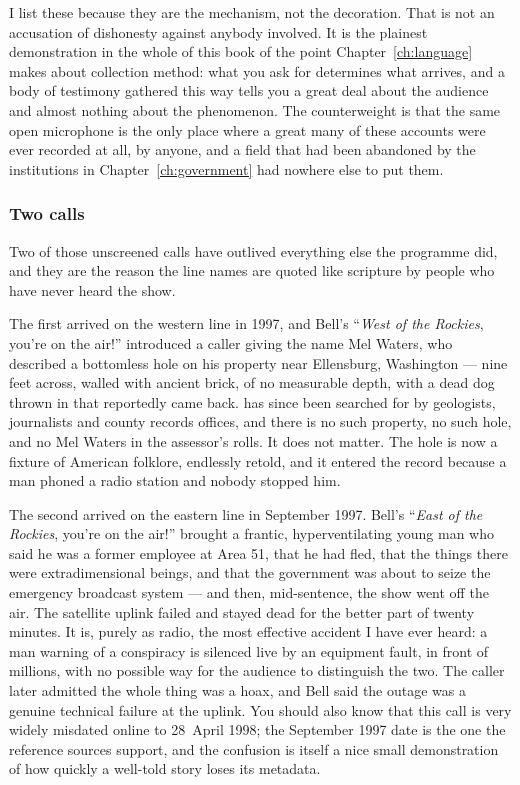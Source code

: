 I list these because they are the mechanism, not the decoration.  That is not an accusation of dishonesty against anybody involved. It is the plainest
demonstration in the whole of this book of the point Chapter~\ref{ch:language} makes about
collection method: what you ask for determines what arrives, and a body of testimony gathered this
way tells you a great deal about the audience and almost nothing about the phenomenon. The
counterweight is that the same open microphone is the only place where a great many of these
accounts were ever recorded at all, by anyone, and a field that had been abandoned by the
institutions in Chapter~\ref{ch:government} had nowhere else to put them.

\subsubsection{Two calls}

Two of those unscreened calls have outlived everything else the programme did, and they are the reason
the line names are quoted like scripture by people who have never heard the show.

The first arrived on the western line in 1997, and Bell's ``\emph{West of the Rockies}, you're on the
air!'' introduced a caller giving the name Mel Waters, who described a bottomless hole on his property
near Ellensburg, Washington --- nine feet across, walled with ancient brick, of no measurable depth,
with a dead dog thrown in that reportedly came back.  has since been searched for by
geologists, journalists and county records offices, and there is no such property, no such hole, and no
Mel Waters in the assessor's rolls. It does not matter. The hole is now a fixture of American folklore,
endlessly retold, and it entered the record because a man phoned a radio station and nobody stopped him.

The second arrived on the eastern line in September 1997. Bell's ``\emph{East of the Rockies}, you're on
the air!'' brought a frantic, hyperventilating young man who said he was a former employee at Area 51,
that he had fled, that the things there were extradimensional beings, and that the government was about
to seize the emergency broadcast system --- and then, mid-sentence, the show went off the air. The
satellite uplink failed and stayed dead for the better part of twenty minutes. It is, purely as radio,
the most effective accident I have ever heard: a man warning of a conspiracy is silenced live by an
equipment fault, in front of millions, with no possible way for the audience to distinguish the two. The
caller later admitted the whole thing was a hoax, and Bell said the outage was a genuine technical
failure at the uplink. You should also know that this call is very widely misdated online to
28~April 1998; the September 1997 date is the one the reference sources support, and the confusion is
itself a nice small demonstration of how quickly a well-told story loses its metadata.

